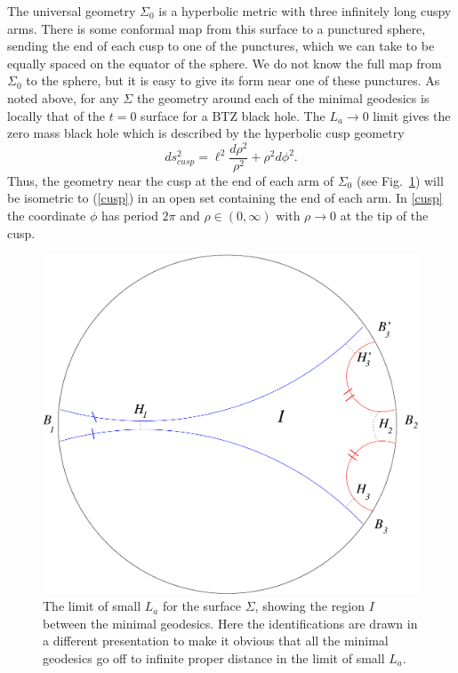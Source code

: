 \documentclass[12pt]{article}
\numberwithin{equation}{section}
\begin{document}
The universal geometry $\Sigma_0$ is a hyperbolic metric with three infinitely long cuspy arms. There is some conformal map from this surface to a punctured sphere, sending the end of each cusp to one of the punctures, which we can take to be equally spaced on the equator of the sphere. We do not know the full map from $\Sigma_0$ to the sphere, but it is easy to give its form near one of these punctures.  As noted above, for any $\Sigma$  the geometry around each of the minimal geodesics is locally that of the $t=0$ surface for a BTZ black hole.    The $L_a \rightarrow 0$ limit gives the zero mass black hole which is described by the  hyperbolic cusp geometry
\begin{equation}
\label{cusp}
ds^2_{cusp} = \ell^2 \frac{d\rho^2}{\rho^2} + \rho^2 d \phi^2.
\end{equation}
Thus, the geometry near the cusp at the end of each arm of $\Sigma_0$  (see Fig.~\ref{sigma0}) will be isometric to (\ref{cusp}) in an open set containing the end of each arm.   In \eqref{cusp} the coordinate $\phi$ has period $2 \pi$ and $\rho \in (0, \infty)$ with $\rho \rightarrow 0$ at the tip of the cusp.

\begin{figure}
\centering
\includegraphics[keepaspectratio,width=0.5\linewidth]{pants_small.pdf}
\caption{The limit of small $L_a$ for the surface $\Sigma$, showing the region $I$ between the minimal geodesics. Here the identifications are drawn in a different presentation to make it obvious that all the minimal geodesics go off to infinite proper distance in the limit of small $L_a$.}
\label{sigma0}
\end{figure}
\end{document}
